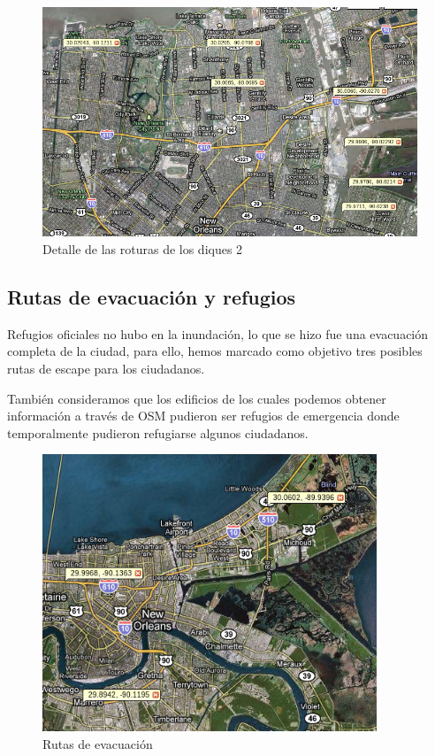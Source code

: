 \begin{figure}[H]
 \centering
 \includegraphics[width=140mm]{figuras/cap6/dikes2.png}
 \caption{Detalle de las roturas de los diques 2}
\end{figure}

\subsection*{Rutas de evacuación y refugios}

Refugios oficiales no hubo en la inundación, lo que se hizo fue una evacuación
completa de la ciudad, para ello, hemos marcado como objetivo tres posibles
rutas de escape para los ciudadanos.

También consideramos que los edificios de los cuales podemos obtener
información a través de OSM pudieron ser refugios de emergencia donde
temporalmente pudieron refugiarse algunos ciudadanos.

\begin{figure}[H]
 \centering
 \includegraphics[width=100mm]{figuras/cap6/evacuation.png}
 \caption{Rutas de evacuación}
\end{figure}

